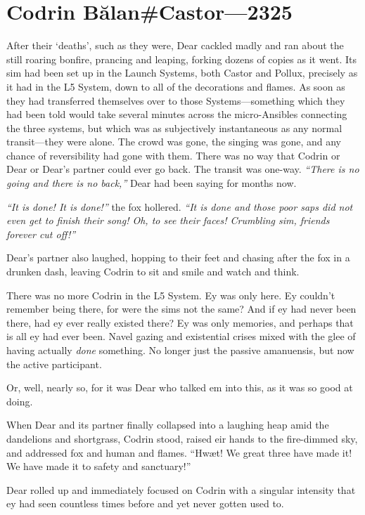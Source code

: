 \hypertarget{codrin-bux103lancastor-2325}{%
\chapter{Codrin Bălan\#Castor---2325}\label{codrin-bux103lancastor-2325}}

After their `deaths', such as they were, Dear cackled madly and ran about the still roaring bonfire, prancing and leaping, forking dozens of copies as it went. Its sim had been set up in the Launch Systems, both Castor and Pollux, precisely as it had in the L5 System, down to all of the decorations and flames. As soon as they had transferred themselves over to those Systems---something which they had been told would take several minutes across the micro-Ansibles connecting the three systems, but which was as subjectively instantaneous as any normal transit---they were alone. The crowd was gone, the singing was gone, and any chance of reversibility had gone with them. There was no way that Codrin or Dear or Dear's partner could ever go back. The transit was one-way. \emph{``There is no going and there is no back,''} Dear had been saying for months now.

\emph{``It is done! It is done!''} the fox hollered. \emph{``It is done and those poor saps did not even get to finish their song! Oh, to see their faces! Crumbling sim, friends forever cut off!''}

Dear's partner also laughed, hopping to their feet and chasing after the fox in a drunken dash, leaving Codrin to sit and smile and watch and think.

There was no more Codrin in the L5 System. Ey was only here. Ey couldn't remember being there, for were the sims not the same? And if ey had never been there, had ey ever really existed there? Ey was only memories, and perhaps that is all ey had ever been. Navel gazing and existential crises mixed with the glee of having actually \emph{done} something. No longer just the passive amanuensis, but now the active participant.

Or, well, nearly so, for it was Dear who talked em into this, as it was so good at doing.

When Dear and its partner finally collapsed into a laughing heap amid the dandelions and shortgrass, Codrin stood, raised eir hands to the fire-dimmed sky, and addressed fox and human and flames. ``Hwæt! We great three have made it! We have made it to safety and sanctuary!''

Dear rolled up and immediately focused on Codrin with a singular intensity that ey had seen countless times before and yet never gotten used to.


